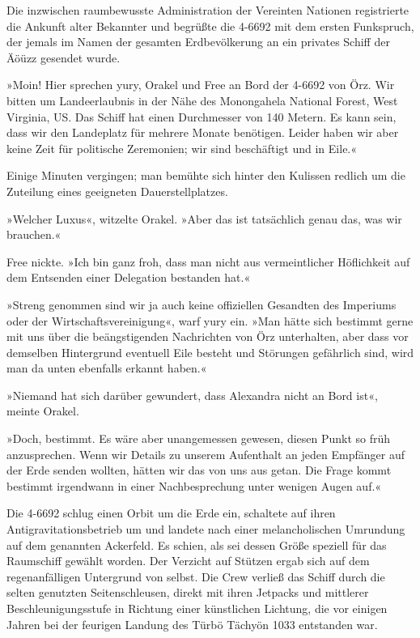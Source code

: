 Die inzwischen raumbewusste Administration der Vereinten Nationen registrierte die Ankunft alter Bekannter und begrüßte die 4-6692 mit dem ersten Funkspruch, der jemals im Namen der gesamten Erdbevölkerung an ein privates Schiff der Äöüzz gesendet wurde.


»Moin! Hier sprechen yury, Orakel und Free an Bord der 4-6692 von Örz. Wir bitten um Landeerlaubnis in der Nähe des Monongahela National Forest, West Virginia, US. Das Schiff hat einen Durchmesser von 140 Metern. Es kann sein, dass wir den Landeplatz für mehrere Monate benötigen. Leider haben wir aber keine Zeit für politische Zeremonien; wir sind beschäftigt und in Eile.«

Einige Minuten vergingen; man bemühte sich hinter den Kulissen redlich um die Zuteilung eines geeigneten Dauerstellplatzes.


»Welcher Luxus«, witzelte Orakel. »Aber das ist tatsächlich genau das, was wir brauchen.«

Free nickte. »Ich bin ganz froh, dass man nicht aus vermeintlicher Höflichkeit auf dem Entsenden einer Delegation bestanden hat.«

»Streng genommen sind wir ja auch keine offiziellen Gesandten des Imperiums oder der Wirtschaftsvereinigung«, warf yury ein. »Man hätte sich bestimmt gerne mit uns über die beängstigenden Nachrichten von Örz unterhalten, aber dass vor demselben Hintergrund eventuell Eile besteht und Störungen gefährlich sind, wird man da unten ebenfalls erkannt haben.«

»Niemand hat sich darüber gewundert, dass Alexandra nicht an Bord ist«, meinte Orakel.

»Doch, bestimmt. Es wäre aber unangemessen gewesen, diesen Punkt so früh anzusprechen. Wenn wir Details zu unserem Aufenthalt an jeden Empfänger auf der Erde senden wollten, hätten wir das von uns aus getan. Die Frage kommt bestimmt irgendwann in einer Nachbesprechung unter wenigen Augen auf.«

Die 4-6692 schlug einen Orbit um die Erde ein, schaltete auf ihren Antigravitationsbetrieb um und landete nach einer melancholischen Umrundung auf dem genannten Ackerfeld. Es schien, als sei dessen Größe speziell für das Raumschiff gewählt worden. Der Verzicht auf Stützen ergab sich auf dem regenanfälligen Untergrund von selbst. Die Crew verließ das Schiff durch die selten genutzten Seitenschleusen, direkt mit ihren Jetpacks und mittlerer Beschleunigungsstufe in Richtung einer künstlichen Lichtung, die vor einigen Jahren bei der feurigen Landung des Türbö Tächyön 1033 entstanden war.

